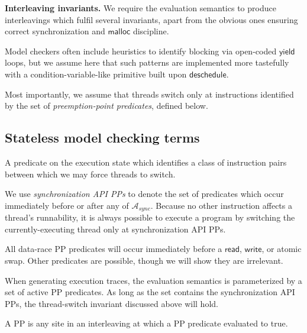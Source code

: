 {\bf Interleaving invariants.}
We require the evaluation semantics to produce interleavings which fulfil several invariants,
apart from the obvious ones ensuring correct synchronization and $\mathsf{malloc}$ discipline.

Model checkers often include heuristics to identify blocking via open-coded $\mathsf{yield}$ loops,
but we assume here that such patterns are implemented more tastefully with a condition-variable-like primitive built upon $\mathsf{deschedule}$.

Most importantly, we assume that threads switch only at instructions identified by the set of {\em preemption-point predicates}, defined below.

\subsection{Stateless model checking terms}

\begin{definition}
	A predicate on the execution state which identifies a class of instruction pairs between which we may force threads to switch.
\end{definition}

We use {\em synchronization API PPs} to denote the set of predicates
which occur immediately before or after any of $\mathcal{A}_{sync}$.
Because no other instruction affects a thread's runnability, it is always possible to execute a program by switching the currently-executing thread only at synchronization API PPs.

All data-race PP predicates will occur immediately before a $\mathsf{read}$, $\mathsf{write}$, or atomic swap.
Other predicates are possible, though we will show they are irrelevant.

When generating execution traces, the evaluation semantics is parameterized by a set of active PP predicates.
As long as the set contains the synchronization API PPs,
the thread-switch invariant discussed above will hold.

\begin{definition}
	A PP is any site in an interleaving at which a PP predicate evaluated to true.
\end{definition}

